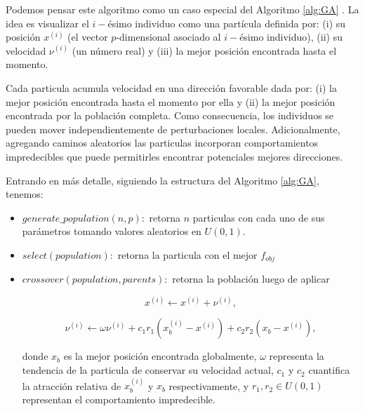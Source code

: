 
Podemos pensar este algoritmo como un caso especial del Algoritmo \ref{alg:GA}
\citep{Mykel2019, Prosopio-Galarza2019}.
La idea es visualizar el $i-$ésimo individuo como una partícula definida por: 
(i) su posición $x^{(i)}$ (el vector $p$-dimensional asociado al $i-$ésimo individuo),
(ii) su velocidad $\nu^{(i)}$ (un número real) y
(iii) la mejor posición encontrada hasta el momento.

Cada particula acumula velocidad en una dirección favorable dada por: 
(i) la mejor posición encontrada hasta el momento por ella y 
(ii) la mejor posición encontrada por la población completa.
Como consecuencia, los individuos se pueden mover independientemente de
perturbaciones locales.
Adicionalmente, agregando caminos aleatorios las particulas incorporan
comportamientos impredecibles que puede permitirles encontrar potenciales
mejores direcciones.

Entrando en más detalle, siguiendo la estructura del Algoritmo \ref{alg:GA}, tenemos:

\begin{itemize}

\item $generate\_population(n, p):$ retorna $n$ particulas con cada uno de
      sus parámetros tomando valores aleatorios en $U(0, 1)$.

\item $select(population):$ retorna la particula con el mejor $f_{obj}$

\item $crossover(population, parents):$ retorna la población luego de aplicar 
    
  \begin{equation}
    x^{(i)} \gets x^{(i)} + \nu^{(i)},
  \label{pso-pos}
  \end{equation}

  \begin{equation}
    \nu^{(i)} \gets \omega \nu^{(i)} + c_1 r_1 \left(x_{b}^{(i)} - x^{(i)}
    \right) + c_2 r_2 \left(x_{b} - x^{(i)} \right),
  \label{pso-speed}
  \end{equation}
    

  donde $x_{b}$  es la mejor posición encontrada globalmente, 
  $\omega$ representa la tendencia de la particula de conservar su velocidad actual,
  $c_1$ y $c_2$ cuantifica la atracción relativa de $x_{b}^{(i)}$ y $x_{b}$ respectivamente, 
  y $r_1, r_2 \in U(0, 1)$ representan el comportamiento impredecible.

\end{itemize}


